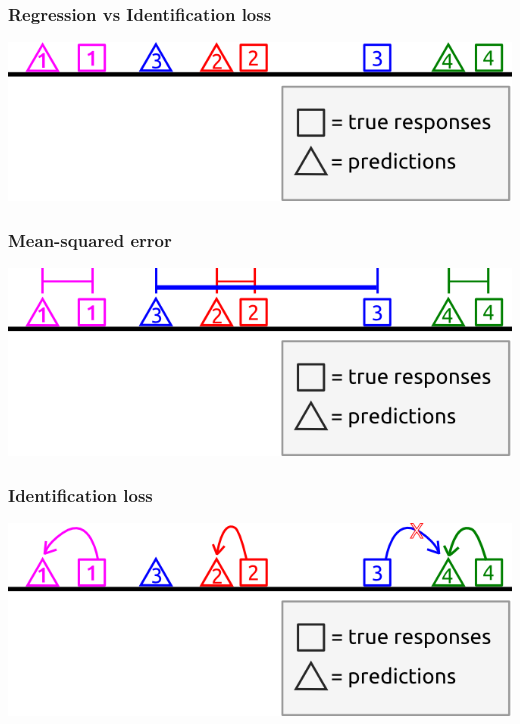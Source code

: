 \documentclass{beamer}
\begin{document}
\begin{frame}
\frametitle{Regression vs Identification loss}
\begin{center}
\includegraphics[scale = 0.5]{../diagram/idloss1.png}
\end{center}
\end{frame}

\begin{frame}
\frametitle{Mean-squared error}
\begin{center}
\includegraphics[scale = 0.5]{../diagram/idloss2a.png}
\end{center}
\end{frame}

\begin{frame}
\frametitle{Identification loss}
\begin{center}
\includegraphics[scale = 0.5]{../diagram/idloss2b.png}
\end{center}
\end{frame}

\end{document}
